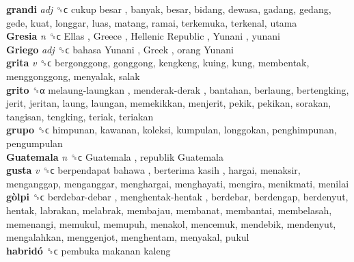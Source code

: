 \textbf{grandi} \emph{adj}  ␝ϲ   cukup besar , banyak, besar, bidang, dewasa, gadang, gedang, gede, kuat, longgar, luas, matang, ramai, terkemuka, terkenal, utama  \\
\textbf{Gresia} \emph{n}  ␝ϲ   Ellas ,  Greece ,  Hellenic Republic ,  Yunani , yunani  \\
\textbf{Griego} \emph{adj}  ␝ϲ   bahasa Yunani ,  Greek ,  orang Yunani   \\
\textbf{grita} \emph{v}  ␝ϲ  bergonggong, gonggong, kengkeng, kuing, kung, membentak, menggonggong, menyalak, salak  \\
\textbf{grito} ␝α   melaung-laungkan ,  menderak-derak , bantahan, berlaung, bertengking, jerit, jeritan, laung, laungan, memekikkan, menjerit, pekik, pekikan, sorakan, tangisan, tengking, teriak, teriakan  \\
\textbf{grupo} ␝ϲ  himpunan, kawanan, koleksi, kumpulan, longgokan, penghimpunan, pengumpulan  \\
\textbf{Guatemala} \emph{n}  ␝ϲ   Guatemala ,  republik Guatemala   \\
\textbf{gusta} \emph{v}  ␝ϲ   berpendapat bahawa ,  berterima kasih , hargai, menaksir, menganggap, menganggar, menghargai, menghayati, mengira, menikmati, menilai  \\
\textbf{gòlpi} ␝ϲ   berdebar-debar ,  menghentak-hentak , berdebar, berdengap, berdenyut, hentak, labrakan, melabrak, membajau, membanat, membantai, membelasah, memenangi, memukul, memupuh, menakol, mencemuk, mendebik, mendenyut, mengalahkan, menggenjot, menghentam, menyakal, pukul  \\
\textbf{habridó} ␝ϲ   pembuka makanan kaleng   \\
